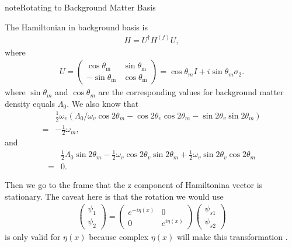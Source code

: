\documentclass[letterpaper,12pt,english]{sphinxmanual}
\begin{document}
\begin{sphinxadmonition}{note}{Rotating to Background Matter Basis}

The Hamiltonian in background basis is
\begin{equation*}
\begin{split}H = U^\dagger H^{(f)} U,\end{split}
\end{equation*}
where
\begin{equation*}
\begin{split}U = \begin{pmatrix}
\cos \theta_{\mathrm{m}} & \sin \theta_{\mathrm{m}} \\
-\sin \theta_{\mathrm{m}} & \cos \theta_{\mathrm{m}}
\end{pmatrix} = \cos \theta_m I + i\sin \theta_m \sigma_2.\end{split}
\end{equation*}
where \(\sin \theta_m\) and \(\cos \theta_m\) are the corresponding values for background matter density equals \(\Lambda_0\). We also know that
\begin{equation*}
\begin{split}&\frac{1}{2}\omega_v\left( \Lambda_0/\omega_v \cos 2\theta_m - \cos 2\theta_v\cos 2\theta_m - \sin 2\theta_v\sin 2\theta_m \right) \\
=&-\frac{1}{2}\omega_m,\end{split}
\end{equation*}
and
\begin{equation*}
\begin{split}&\frac{1}{2}\Lambda_0 \sin 2\theta_m - \frac{1}{2} \omega_v \cos 2\theta_v \sin 2\theta_m + \frac{1}{2} \omega_v \sin 2\theta_v \cos 2\theta_m \\
=& 0.\end{split}
\end{equation*}\end{sphinxadmonition}

Then we go to the frame that the z component of Hamiltonina vector is stationary. The caveat here is that the rotation we would use
\begin{equation*}
\begin{split}\begin{pmatrix} \psi_1 \\ \psi_2 \end{pmatrix} = \begin{pmatrix} e^{-i \eta (x)} & 0 \\  0 & e^{i \eta (x)}  \end{pmatrix} \begin{pmatrix} \psi_{s1} \\ \psi_{s2} \end{pmatrix}\end{split}
\end{equation*}
is only valid for  \(\eta(x)\) because complex \(\eta(x)\) will make this transformation .
\end{document}
